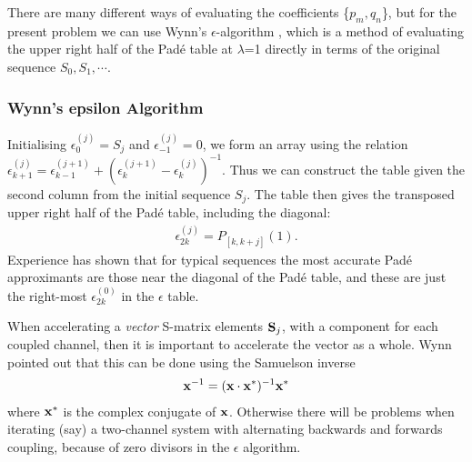 \documentclass[11pt,a4paper]{article}
\begin{document}
There are many different ways \cite{Pade}
of evaluating the coefficients
\{$p_m , q_n$\}, but for the present problem we can use
Wynn's $\epsilon$-algorithm \cite{wynn66}, which is a method of evaluating
the upper right half of the Pad\'e table at $\lambda$=1 directly
in terms of the original sequence  $S_0 , S_1 , \cdots $.

\subsubsection{Wynn's epsilon Algorithm}

Initialising $\epsilon_0^{(j)} = S_j $
and $ \epsilon^{(j)}_{-1} = 0 $,
we form an array
using the relation $ \epsilon^(j)_{k+1} = \epsilon^{(j+1)}_{k-1} +
  ( \epsilon_k^{(j+1)} - \epsilon_k^{(j)} ) ^ {-1} .  $
Thus we can construct the table given the second column from the initial sequence
$ S_j $.
The table then gives the transposed upper right half of the Pad\'e table,
including the diagonal:
\begin{eqnarray}
  \epsilon^{(j)}_{2k}  = P_{[k,k+j]} (1) .
\end{eqnarray}
Experience has shown that for typical sequences the most accurate Pad\'e
approximants are those near the diagonal of the Pad\'e table,
and these are just the right-most
$ \epsilon^{(0)}_{2k} $ in the $\epsilon$ table.

When accelerating a {\em vector} S-matrix elements
$ {\bf S}_j $, with a component for each coupled channel,
then it is important to accelerate the vector as a whole.
Wynn \cite{wynn61}
pointed out that this can be done using the Samuelson inverse
\begin{eqnarray}
  {\bf x}^{-1} = ({\bf x} \cdot {\bf x}^* ) ^ {-1} {\bf x}^*
\end{eqnarray}
where $ {\bf x}^* $ is the complex conjugate of ${\bf x}$.
Otherwise there will be problems when iterating (say) a two-channel
system with alternating backwards and forwards coupling,
because of zero divisors in the $\epsilon$ algorithm.
\end{document}
